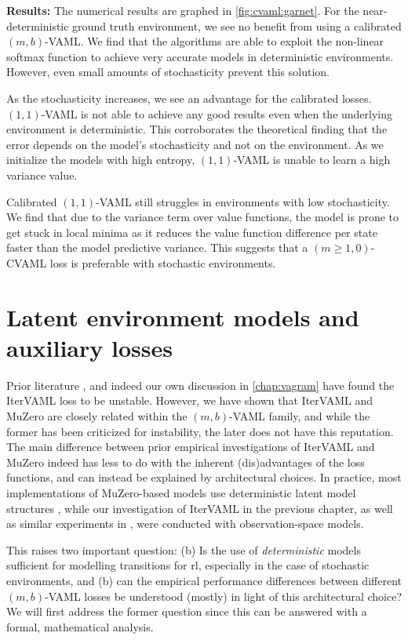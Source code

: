 \textbf{Results:}
The numerical results are graphed in \autoref{fig:cvaml:garnet}.
For the near-deterministic ground truth environment, we see no benefit from using a calibrated $(m,b)$-VAML.
We find that the algorithms are able to exploit the non-linear softmax function to achieve very accurate models in deterministic environments.
However, even small amounts of stochasticity prevent this solution.

As the stochasticity increases, we see an advantage for the calibrated losses.
$(1,1)$-VAML is not able to achieve any good results even when the underlying environment is deterministic.
This corroborates the theoretical finding that the error depends on the model's stochasticity and not on the environment.
As we initialize the models with high entropy, $(1,1)$-VAML is unable to learn a high variance value.

Calibrated $(1,1)$-VAML still struggles in environments with low stochasticity.
We find that due to the variance term over value functions, the model is prone to get stuck in local minima as it reduces the value function difference per state faster than the model predictive variance.
This suggests that a $(m\geq1,0)$-CVAML loss is preferable with stochastic environments.

\section{Latent environment models and auxiliary losses}
Prior literature \parencite{lovatto2020decision}, and indeed our own discussion in \autoref{chap:vagram} have found the IterVAML loss to be unstable.
However, we have shown that IterVAML and MuZero are closely related within the $(m,b)$-VAML family, and while the former has been criticized for instability, the later does not have this reputation.
The main difference between prior empirical investigations of IterVAML and MuZero indeed has less to do with the inherent (dis)advantages of the loss functions, and can instead be explained by architectural choices.
In practice, most implementations of MuZero-based models use deterministic latent model structures \parencite{schrittwieser2020mastering,ye2021mastering,hansen2022temporal,antonoglou2022planning}, while our investigation of IterVAML in the previous chapter, as well as similar experiments in \textcite{lovatto2020decision}, were conducted with observation-space models.

This raises two important question: (b) Is the use of \emph{deterministic} models sufficient for modelling transitions for \ac{rl}, especially in the case of stochastic environments, and (b) can the empirical performance differences between different $(m,b)$-VAML losses be understood (mostly) in light of this architectural choice?
We will first address the former question since this can be answered with a formal, mathematical analysis. 

